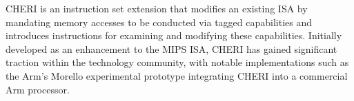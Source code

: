 CHERI is an instruction set extension that modifies an existing ISA by mandating memory accesses to be conducted via tagged 
capabilities and introduces instructions for examining and modifying these capabilities. Initially developed as an 
enhancement to the MIPS ISA, CHERI has gained significant traction within the technology community, 
with notable implementations such as the Arm's Morello experimental prototype integrating CHERI into a 
commercial Arm processor.
\newline

